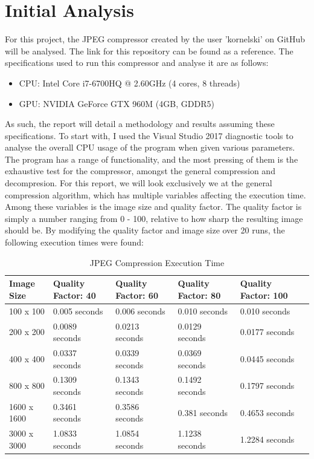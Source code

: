 \documentclass[12pt, a4paper]{article}
\begin{document}
\section{Initial Analysis}

For this project, the JPEG compressor created by the user 'kornelski' on GitHub will be analysed. The link for this repository can be found as a reference. The specifications used to run this compressor and analyse it are as follows: \\

\begin{itemize}
\item CPU: Intel Core i7-6700HQ @ 2.60GHz (4 cores, 8 threads)
\item GPU: NVIDIA GeForce GTX 960M (4GB, GDDR5) \\
\end{itemize}

As such, the report will detail a methodology and results assuming these specifications. To start with, I used the Visual Studio 2017 diagnostic tools to analyse the overall CPU usage of the program when given various parameters. The program has a range of functionality, and the most pressing of them is the exhaustive test for the compressor, amongst the general compression and decompresion. For this report, we will look exclusively we at the general compression algorithm, which has multiple variables affecting the execution time. Among these variables is the image size and quality factor. The quality factor is simply a number ranging from 0 - 100, relative to how sharp the resulting image should be. By modifying the quality factor and image size over 20 runs, the following execution times were found: \\

\begin{table}[H]
    \centering
    \begin{tabular}{| l | l | l | l | l | l |}
    \hline
    Image Size & Quality Factor: 40 & Quality Factor: 60 & Quality Factor: 80 & Quality Factor: 100  \\ \hline
    100 x 100 & 0.005 seconds & 0.006 seconds & 0.010 seconds & 0.010 seconds \\ \hline
    200 x 200 & 0.0089 seconds & 0.0213 seconds & 0.0129 seconds & 0.0177 seconds \\ \hline
    400 x 400 & 0.0337 seconds & 0.0339 seconds & 0.0369 seconds & 0.0445 seconds \\ \hline
    800 x 800 & 0.1309 seconds & 0.1343 seconds & 0.1492 seconds & 0.1797 seconds \\ \hline
    1600 x 1600 & 0.3461 seconds & 0.3586 seconds & 0.381 seconds & 0.4653 seconds \\ \hline
    3000 x 3000 & 1.0833 seconds & 1.0854 seconds & 1.1238 seconds & 1.2284 seconds \\ \hline
    \end{tabular}
    \caption{JPEG Compression Execution Time}
\end{table}
\end{document}
